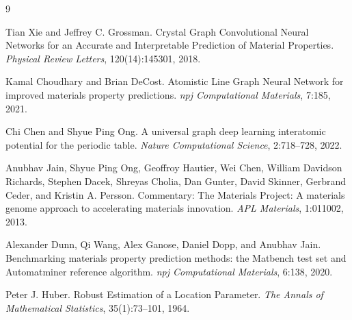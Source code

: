 \documentclass[UTF8,a4paper,11pt]{ctexart}
\begin{document}
\begin{thebibliography}{9}

Tian Xie and Jeffrey C. Grossman.
\newblock Crystal Graph Convolutional Neural Networks for an Accurate and Interpretable Prediction of Material Properties.
\newblock \emph{Physical Review Letters}, 120(14):145301, 2018.

Kamal Choudhary and Brian DeCost.
\newblock Atomistic Line Graph Neural Network for improved materials property predictions.
\newblock \emph{npj Computational Materials}, 7:185, 2021.

Chi Chen and Shyue Ping Ong.
\newblock A universal graph deep learning interatomic potential for the periodic table.
\newblock \emph{Nature Computational Science}, 2:718--728, 2022.

Anubhav Jain, Shyue Ping Ong, Geoffroy Hautier, Wei Chen, William Davidson Richards, Stephen Dacek, Shreyas Cholia, Dan Gunter, David Skinner, Gerbrand Ceder, and Kristin A. Persson.
\newblock Commentary: The Materials Project: A materials genome approach to accelerating materials innovation.
\newblock \emph{APL Materials}, 1:011002, 2013.

Alexander Dunn, Qi Wang, Alex Ganose, Daniel Dopp, and Anubhav Jain.
\newblock Benchmarking materials property prediction methods: the Matbench test set and Automatminer reference algorithm.
\newblock \emph{npj Computational Materials}, 6:138, 2020.

Peter J. Huber.
\newblock Robust Estimation of a Location Parameter.
\newblock \emph{The Annals of Mathematical Statistics}, 35(1):73--101, 1964.

\end{thebibliography}
\end{document}

